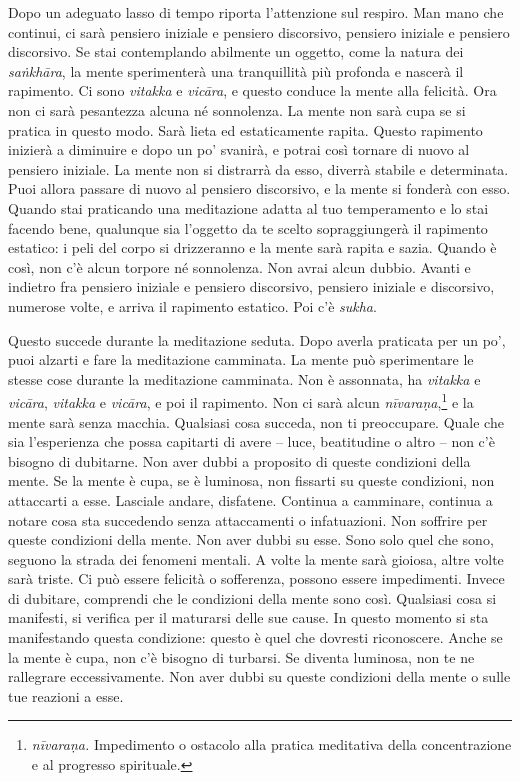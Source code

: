 Dopo un adeguato lasso di tempo riporta l'attenzione sul respiro. Man
mano che continui, ci sarà pensiero iniziale e pensiero discorsivo,
pensiero iniziale e pensiero discorsivo. Se stai contemplando abilmente
un oggetto, come la natura dei \emph{saṅkhāra}, la mente sperimenterà
una tranquillità più profonda e nascerà il rapimento. Ci sono
\emph{vitakka} e \emph{vicāra}, e questo conduce la mente alla felicità.
Ora non ci sarà pesantezza alcuna né sonnolenza. La mente non sarà cupa
se si pratica in questo modo. Sarà lieta ed estaticamente rapita. Questo
rapimento inizierà a diminuire e dopo un po' svanirà, e potrai così
tornare di nuovo al pensiero iniziale. La mente non si distrarrà da
esso, diverrà stabile e determinata. Puoi allora passare di nuovo al
pensiero discorsivo, e la mente si fonderà con esso. Quando stai
praticando una meditazione adatta al tuo temperamento e lo stai facendo
bene, qualunque sia l'oggetto da te scelto sopraggiungerà il rapimento
estatico: i peli del corpo si drizzeranno e la mente sarà rapita e
sazia. Quando è così, non c'è alcun torpore né sonnolenza. Non avrai
alcun dubbio. Avanti e indietro fra pensiero iniziale e pensiero
discorsivo, pensiero iniziale e discorsivo, numerose volte, e arriva il
rapimento estatico. Poi c'è \emph{sukha}.

Questo succede durante la meditazione seduta. Dopo averla praticata per
un po', puoi alzarti e fare la meditazione camminata. La mente può
sperimentare le stesse cose durante la meditazione camminata. Non è
assonnata, ha \emph{vitakka} e \emph{vicāra}, \emph{vitakka} e
\emph{vicāra}, e poi il rapimento. Non ci sarà alcun
\emph{nīvaraṇa},\footnote{\emph{nīvaraṇa.} Impedimento o ostacolo alla
  pratica meditativa della concentrazione e al progresso spirituale.} e
la mente sarà senza macchia. Qualsiasi cosa succeda, non ti preoccupare.
Quale che sia l'esperienza che possa capitarti di avere -- luce,
beatitudine o altro -- non c'è bisogno di dubitarne. Non aver dubbi a
proposito di queste condizioni della mente. Se la mente è cupa, se è
luminosa, non fissarti su queste condizioni, non attaccarti a esse.
Lasciale andare, disfatene. Continua a camminare, continua a notare cosa
sta succedendo senza attaccamenti o infatuazioni. Non soffrire per
queste condizioni della mente. Non aver dubbi su esse. Sono solo quel
che sono, seguono la strada dei fenomeni mentali. A volte la mente sarà
gioiosa, altre volte sarà triste. Ci può essere felicità o sofferenza,
possono essere impedimenti. Invece di dubitare, comprendi che le
condizioni della mente sono così. Qualsiasi cosa si manifesti, si
verifica per il maturarsi delle sue cause. In questo momento si sta
manifestando questa condizione: questo è quel che dovresti riconoscere.
Anche se la mente è cupa, non c'è bisogno di turbarsi. Se diventa
luminosa, non te ne rallegrare eccessivamente. Non aver dubbi su queste
condizioni della mente o sulle tue reazioni a esse.

